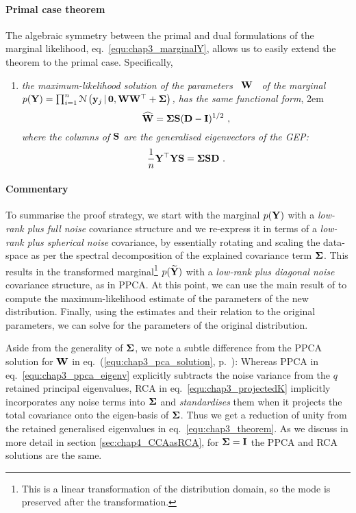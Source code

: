       \paragraph{Primal case theorem} The algebraic symmetry between the primal and dual formulations of the marginal likelihood, eq.~\eqref{equ:chap3_marginalY}, allows us to easily extend the theorem to the primal case. Specifically,
      \begin{enumerate}
	\item[] \textit{the maximum-likelihood solution of the parameters ~$\mathbf{W}$~ of the marginal $p(\mathbf{Y}) = \prod_{i=1}^n \mathcal{N} \left(  \mathbf{y}_j \,|\, \mathbf{0} ,  \mathbf{W}\mathbf{W}^\top + \mathbf{\Sigma} \right)$, has the same functional form},
	\rightskip2em
	\begin{equation} \label{equ:chap3_rca_solution}
	  \widehat{\mathbf{W}} = \mathbf{\Sigma} \mathbf{S} (\mathbf{D} - \mathbf{I})^{1/2} ~,
	\end{equation}
	\textit{where the columns of $\mathbf{S}$ are the generalised eigenvectors of the GEP:}
	\begin{equation} \label{equ:chap3_rcaeigenproblem_primal}
	  \frac{1}{n} \mathbf{Y}^\top \mathbf{Y} \mathbf{S} = \mathbf{\Sigma} \mathbf{S} \mathbf{D} ~.
	\end{equation}
      \end{enumerate}

      \paragraph{Commentary} To summarise the proof strategy, we start with the marginal $p(\mathbf{Y})$ with a \textit{low-rank plus full noise} covariance structure and we re-express it in terms of a \textit{low-rank plus spherical noise} covariance, by essentially rotating and scaling the data-space as per the spectral decomposition of the explained covariance term $\mathbf{\Sigma}$. This results in the transformed marginal\footnote{This is a linear transformation of the distribution domain, so the mode is preserved after the transformation.} $p(\widetilde{\mathbf{Y}})$ with a \textit{low-rank plus diagonal noise} covariance structure, as in PPCA. At this point, we can use the main result of \citet{Tipping:ppca96} to compute the maximum-likelihood estimate of the parameters of the new distribution. Finally, using the estimates and their relation to the original parameters, we can solve for the parameters of the original distribution.

      Aside from the generality of $\mathbf{\Sigma}$, we note a subtle difference from the PPCA solution for $\mathbf{W}$ in eq.~(\ref{equ:chap3_pca_solution}, p.~\pageref{equ:chap3_pca_solution}): Whereas PPCA in eq.~\eqref{equ:chap3_ppca_eigenv} explicitly subtracts the noise variance from the $q$ retained principal eigenvalues, RCA in eq.~\eqref{equ:chap3_projectedK} implicitly incorporates any noise terms into $\mathbf{\Sigma}$ and \emph{standardises} them when it projects the total covariance onto the eigen-basis of $\mathbf{\Sigma}$. Thus we get a reduction of unity from the retained generalised eigenvalues in eq.~\eqref{equ:chap3_theorem}. As we discuss in more detail in section \ref{sec:chap4_CCAasRCA}, for $\mathbf{\Sigma}=\mathbf{I}$ the PPCA and RCA solutions are the same.

